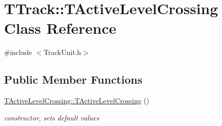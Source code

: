 \hypertarget{class_t_track_1_1_t_active_level_crossing}{}\section{T\+Track\+:\+:T\+Active\+Level\+Crossing Class Reference}
\label{class_t_track_1_1_t_active_level_crossing}


{\ttfamily \#include $<$Track\+Unit.\+h$>$}

\subsection*{Public Member Functions}
\begin{DoxyCompactItemize}
\item 
\mbox{\label{class_t_track_1_1_t_active_level_crossing_adc74855a4f0cb115cef8be85b1288f15}} 
\mbox{\hyperlink{class_t_track_1_1_t_active_level_crossing_adc74855a4f0cb115cef8be85b1288f15}{T\+Active\+Level\+Crossing\+::\+T\+Active\+Level\+Crossing}} ()
\begin{DoxyCompactList}\small\item\em constructor, sets default values \end{DoxyCompactList}\end{DoxyCompactItemize}
